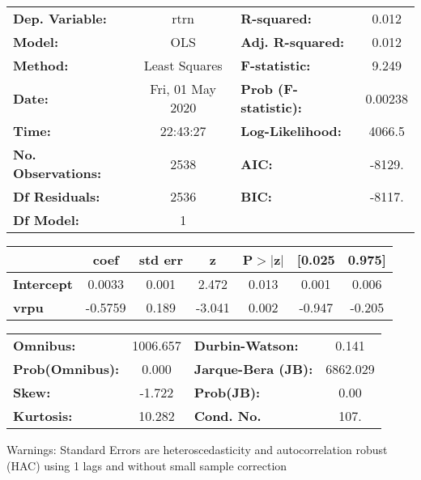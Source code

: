 \begin{center}
\begin{tabular}{lclc}
\toprule
\textbf{Dep. Variable:}    &       rtrn       & \textbf{  R-squared:         } &     0.012   \\
\textbf{Model:}            &       OLS        & \textbf{  Adj. R-squared:    } &     0.012   \\
\textbf{Method:}           &  Least Squares   & \textbf{  F-statistic:       } &     9.249   \\
\textbf{Date:}             & Fri, 01 May 2020 & \textbf{  Prob (F-statistic):} &  0.00238    \\
\textbf{Time:}             &     22:43:27     & \textbf{  Log-Likelihood:    } &    4066.5   \\
\textbf{No. Observations:} &        2538      & \textbf{  AIC:               } &    -8129.   \\
\textbf{Df Residuals:}     &        2536      & \textbf{  BIC:               } &    -8117.   \\
\textbf{Df Model:}         &           1      & \textbf{                     } &             \\
\bottomrule
\end{tabular}
\begin{tabular}{lcccccc}
                   & \textbf{coef} & \textbf{std err} & \textbf{z} & \textbf{P$> |$z$|$} & \textbf{[0.025} & \textbf{0.975]}  \\
\midrule
\textbf{Intercept} &       0.0033  &        0.001     &     2.472  &         0.013        &        0.001    &        0.006     \\
\textbf{vrpu}      &      -0.5759  &        0.189     &    -3.041  &         0.002        &       -0.947    &       -0.205     \\
\bottomrule
\end{tabular}
\begin{tabular}{lclc}
\textbf{Omnibus:}       & 1006.657 & \textbf{  Durbin-Watson:     } &    0.141  \\
\textbf{Prob(Omnibus):} &   0.000  & \textbf{  Jarque-Bera (JB):  } & 6862.029  \\
\textbf{Skew:}          &  -1.722  & \textbf{  Prob(JB):          } &     0.00  \\
\textbf{Kurtosis:}      &  10.282  & \textbf{  Cond. No.          } &     107.  \\
\bottomrule
\end{tabular}
\end{center}

Warnings: \newline
 [1] Standard Errors are heteroscedasticity and autocorrelation robust (HAC) using 1 lags and without small sample correction